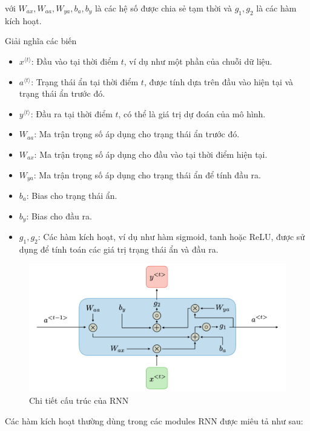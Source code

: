 với $W_{ax}, W_{aa}, W_{ya}, b_a, b_y$ là các hệ số được chia sẻ tạm thời và $g_1, g_2$ là các hàm kích hoạt.

Giải nghĩa các biến
\begin{itemize}
    \item $x^{\langle t \rangle}$: Đầu vào tại thời điểm $t$, ví dụ như một phần của chuỗi dữ liệu.
    \item $a^{\langle t \rangle}$: Trạng thái ẩn tại thời điểm $t$, được tính dựa trên đầu vào hiện tại và trạng thái ẩn trước đó.
    \item $y^{\langle t \rangle}$: Đầu ra tại thời điểm $t$, có thể là giá trị dự đoán của mô hình.
    \item $W_{aa}$: Ma trận trọng số áp dụng cho trạng thái ẩn trước đó.
    \item $W_{ax}$: Ma trận trọng số áp dụng cho đầu vào tại thời điểm hiện tại.
    \item $W_{ya}$: Ma trận trọng số áp dụng cho trạng thái ẩn để tính đầu ra.
    \item $b_{a}$: Bias cho trạng thái ẩn.
    \item $b_{y}$: Bias cho đầu ra.
    \item $g_1, g_2$: Các hàm kích hoạt, ví dụ như hàm sigmoid, tanh hoặc ReLU, được sử dụng để tính toán các giá trị trạng thái ẩn và đầu ra.
\end{itemize}

\begin{figure}[h]
    \centering
    \includegraphics[width=1\textwidth]{images/LSTM/description-block-rnn-ltr.png}
    \caption{Chi tiết cấu trúc của RNN}
    \label{fig:rnn_hidden}
\end{figure}

Các hàm kích hoạt thường dùng trong các modules RNN được miêu tả như sau:

